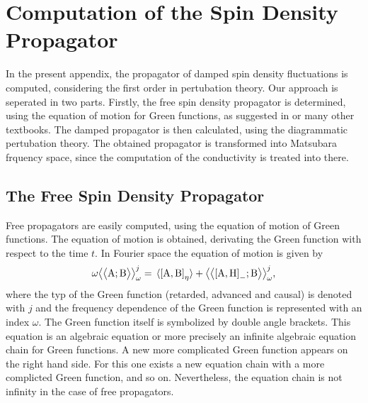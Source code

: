 %
%
%
\chapter{Computation of the Spin Density Propagator}
\label{appch:propagator}
%
%
%
In the present appendix, the propagator of damped spin density fluctuations is computed, considering the first order in pertubation theory.
Our approach is seperated in two parts.
Firstly, the free spin density propagator is determined, using the equation of motion for Green functions, as suggested in \cite{Elk&Gasser} or many other textbooks.
The damped propagator is then calculated, using the diagrammatic pertubation theory.
The obtained propagator is transformed into Matsubara frquency space, since the computation of the conductivity is treated into there.
%
%
\section{The Free Spin Density Propagator}
\label{appsec:free propagator}
%
%
Free propagators are easily computed, using the equation of motion of Green functions.
The equation of motion is obtained, derivating the Green function with respect to the time $t$.
In Fourier space the equation of motion is given by
%
\begin{align}
	\omega \green{\mt{A}}{\mt{B}}_{\omega}^{j} = \expval*{\comm{\mt{A}}{\mt{B}}_{\eta}} + \green{\comm{\mt{A}}{\mt{H}}_{-}}{\mt{B}}_{\omega}^{j},
	\label{appeq: algebraic equation chain}
\end{align}
%
where the typ of the Green function (retarded, advanced and causal) is denoted with $j$ and the frequency dependence of the Green function is represented with an index $\omega$.
The Green function itself is symbolized by double angle brackets.
This equation is an algebraic equation or more precisely an infinite algebraic equation chain for Green functions.
A new more complicated Green function appears on the right hand side.
For this one exists a new equation chain with a more complicted Green function, and so on.
Nevertheless, the equation chain is not infinity in the case of free propagators.

